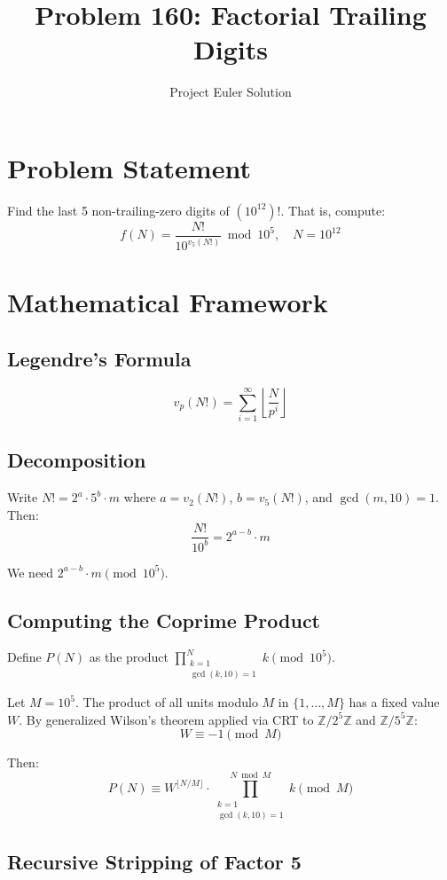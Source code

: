 \documentclass[12pt,a4paper]{article}
\title{Problem 160: Factorial Trailing Digits}
\author{Project Euler Solution}
\date{}
\begin{document}
\maketitle

\section{Problem Statement}

Find the last 5 non-trailing-zero digits of $(10^{12})!$. That is, compute:
\[
f(N) = \frac{N!}{10^{v_5(N!)}} \bmod 10^5, \quad N = 10^{12}
\]

\section{Mathematical Framework}

\subsection{Legendre's Formula}

\[
v_p(N!) = \sum_{i=1}^{\infty} \left\lfloor \frac{N}{p^i} \right\rfloor
\]

\subsection{Decomposition}

Write $N! = 2^{a} \cdot 5^{b} \cdot m$ where $a = v_2(N!)$, $b = v_5(N!)$, and $\gcd(m, 10) = 1$. Then:
\[
\frac{N!}{10^b} = 2^{a-b} \cdot m
\]

We need $2^{a-b} \cdot m \pmod{10^5}$.

\subsection{Computing the Coprime Product}

Define $P(N)$ as the product $\prod_{\substack{k=1 \\ \gcd(k,10)=1}}^{N} k \pmod{10^5}$.

Let $M = 10^5$. The product of all units modulo $M$ in $\{1, \ldots, M\}$ has a fixed value $W$. By generalized Wilson's theorem applied via CRT to $\mathbb{Z}/2^5\mathbb{Z}$ and $\mathbb{Z}/5^5\mathbb{Z}$:
\[
W \equiv -1 \pmod{M}
\]

Then:
\[
P(N) \equiv W^{\lfloor N/M \rfloor} \cdot \prod_{\substack{k=1 \\ \gcd(k,10)=1}}^{N \bmod M} k \pmod{M}
\]

\subsection{Recursive Stripping of Factor 5}
\end{document}
